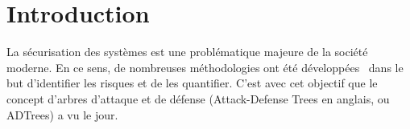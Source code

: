 \section{Introduction}
	\label{sec:intro}








La sécurisation des systèmes est une problématique majeure de la société moderne. En ce sens, de nombreuses méthodologies ont été développées~\cite{introSecurite,ADTreeKordy} dans le but d'identifier les risques et de les quantifier. C'est avec cet objectif que le concept d'arbres d'attaque et de défense (\og Attack-Defense Trees \fg{} en anglais, ou ADTrees) a vu le jour.

